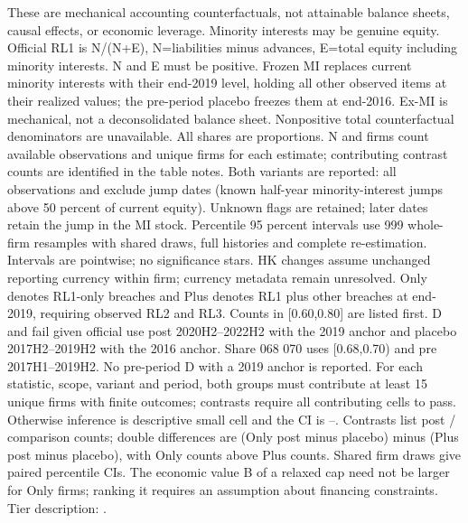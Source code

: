 \begin{table}[!htbp]
\begin{threeparttable}
\begin{tablenotes}[flushleft]
\item[] These are mechanical accounting counterfactuals, not attainable balance sheets, causal effects, or economic leverage. Minority interests may be genuine equity. Official RL1 is N/(N+E), N=liabilities minus advances, E=total equity including minority interests. N and E must be positive. Frozen MI replaces current minority interests with their end-2019 level, holding all other observed items at their realized values; the pre-period placebo freezes them at end-2016. Ex-MI is mechanical, not a deconsolidated balance sheet. Nonpositive total counterfactual denominators are unavailable. All shares are proportions. N and firms count available observations and unique firms for each estimate; contributing contrast counts are identified in the table notes. Both variants are reported: all observations and exclude jump dates (known half-year minority-interest jumps above 50 percent of current equity). Unknown flags are retained; later dates retain the jump in the MI stock. Percentile 95 percent intervals use 999 whole-firm resamples with shared draws, full histories and complete re-estimation. Intervals are pointwise; no significance stars. HK changes assume unchanged reporting currency within firm; currency metadata remain unresolved. Only denotes RL1-only breaches and Plus denotes RL1 plus other breaches at end-2019, requiring observed RL2 and RL3. Counts in [0.60,0.80] are listed first. D and fail given official use post 2020H2--2022H2 with the 2019 anchor and placebo 2017H2--2019H2 with the 2016 anchor. Share 068 070 uses [0.68,0.70) and pre 2017H1--2019H2. No pre-period D with a 2019 anchor is reported. For each statistic, scope, variant and period, both groups must contribute at least 15 unique firms with finite outcomes; contrasts require all contributing cells to pass. Otherwise inference is descriptive small cell and the CI is --. Contrasts list post / comparison counts; double differences are (Only post minus placebo) minus (Plus post minus placebo), with Only counts above Plus counts. Shared firm draws give paired percentile CIs. The economic value B of a relaxed cap need not be larger for Only firms; ranking it requires an assumption about financing constraints. Tier description: \citet{jin2025deleveraging}.
\end{tablenotes}
\end{threeparttable}
\end{table}

